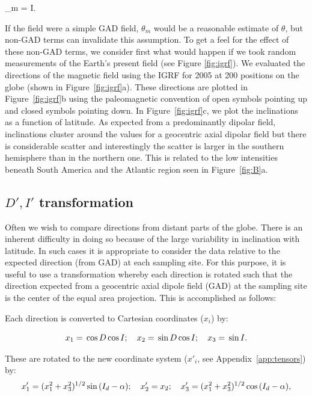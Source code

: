 \beq
\cot \theta_m = \half \tan I.
\label{eq:mcolat}
\eeq

If the field were a simple GAD field,  $\theta_m$ would be a reasonable estimate of
$\theta$, but non-GAD terms can invalidate this assumption.   To get a feel for the effect of these non-GAD terms, we
consider first what would happen if we took random measurements of the
Earth's present field (see Figure \ref{fig:igrf}).  We evaluated the 
directions of the magnetic field  using the IGRF for 
2005 at   200 positions on the globe (shown in 
Figure~\ref{fig:igrf}a).  These directions are plotted in
Figure~\ref{fig:igrf}b using the paleomagnetic convention 
of open symbols pointing up and closed symbols pointing down.  
In
Figure~\ref{fig:igrf}c, we plot the inclinations as a function of latitude.
As expected from a predominantly dipolar field, 
inclinations cluster around the values for a geocentric axial
dipolar field but there is considerable scatter and interestingly the scatter is larger in the southern hemisphere than in the northern one.   This is related to the low intensities beneath South America and the Atlantic region seen in Figure~\ref{fig:B}a. 

\subsection{$D', I' $ transformation}  

Often we wish to compare directions from distant parts of the globe.  There is an inherent difficulty in doing so because of the large variability in inclination with latitude.  
In such cases it is appropriate to  consider the data relative to the expected direction (from GAD) at each sampling 
site.  For this purpose, it is useful to use a transformation   
whereby each direction is rotated such that the  direction expected from a
geocentric axial dipole field (GAD) at the sampling site is the center of the equal 
area projection.  This is accomplished as follows:

Each direction is converted to Cartesian coordinates ($x_{i}$) by:

\begin{equation}
x_{1}= \cos D \cos I; \hskip 1em
x_{2}= \sin D \cos I; \hskip 1em x_{3}= \sin I.
\label{eq:dir2cart}
\end{equation}

\noindent
These are rotated to the new coordinate system ($x'_{i}$, see Appendix~\ref{app:tensors}) by:
$$
x'_{1}= (x_{1}^{2}+x_{3}^{2})^{1/2} \sin (I_{d} - \alpha); \hskip 1em
x'_{2}=x_{2}; \hskip 1em
x'_{3}=(x_{1}^{2}+x_{3}^{2})^{1/2} \cos (I_{d} - \alpha),
$$


